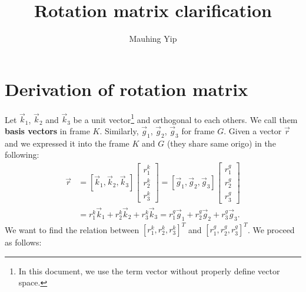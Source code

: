 \documentclass{article}
\title{Rotation matrix clarification}
\author{Mauhing Yip}
\newcommand{\vg}{\vec g}
\newcommand{\vk}{\vec k}
\begin{document}
\maketitle

\section{Derivation of rotation matrix}
Let $\vk_1$, $\vk_2$ and $\vk_3$ be a unit vector\footnote{In this document, we use the term vector without properly define vector space.} and orthogonal to each others. We call them \textbf{basis vectors} in frame $K$. Similarly, $\vg_1$, $\vg_2$, $\vg_3$ for frame $G$.
Given a vector $\vec{r}$ and we expressed it into the frame $K$ and $G$ (they share same origo) in the following:
\begin{align*}
    \vec{r} 
    &=
    [\vec{k}_1, \vec{k}_2, \vec{k}_3]
    \begin{bmatrix}
      r^k_1 \\
      r^k_2 \\
      r^k_3
    \end{bmatrix}
    =
    [\vec{g}_1, \vec{g}_2, \vec{g}_3]
    \begin{bmatrix}
      r^g_1 \\
      r^g_2 \\
      r^g_3 
    \end{bmatrix}
    \\
    &= r^k_1\vec{k}_1 + r^k_2\vec{k}_2 + r^k_3\vec{k}_3
    = r^g_1\vec{g}_1 + r^g_2\vec{g}_2 + r^g_3\vec{g}_3.
\end{align*}
We want to find the relation between $[r^k_1, r^k_2, r^k_3]^T$ and $[r^g_1, r^g_2, r^g_3]^T$. We proceed as follows:
\end{document}
